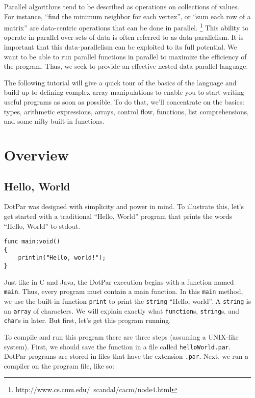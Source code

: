 Parallel algorithms tend to be described as operations on collections of values. For instance, ``find the minimum neighbor for each vertex'', or ``sum each row of a matrix'' are data-centric operations that can be done in parallel. \footnote{http://www.cs.cmu.edu/~scandal/cacm/node4.html} This ability to operate in parallel over sets of data is often referred to as data-parallelism. It is important that this data-parallelism can be exploited to its full potential. We want to be able to run parallel functions in parallel to maximize the efficiency of the program. Thus, we seek to provide an effective nested data-parallel language.

The following tutorial will give a quick tour of the basics of the language and build up to defining complex array manipulations to enable you to start writing useful programs as soon as possible. To do that, we'll concentrate on the basics: types, arithmetic expressions, arrays, control flow, functions, list comprehensions, and some nifty built-in functions.

\section{Overview}
\subsection{Hello, World}
DotPar was designed with simplicity and power in mind. To illustrate this, let's get started with a traditional ``Hello, World'' program that prints the words ``Hello, World'' to stdout.

\begin{verbatim}
func main:void()
{
    println("Hello, world!");
}
\end{verbatim}

Just like in C and Java, the DotPar execution begins with a function named \verb=main=. Thus, every program must contain a main function. In this \verb=main= method, we use the built-in function \verb=print= to print the \verb=string= ``Hello, world''. A \verb=string= is an \verb=array= of characters. We will explain exactly what \verb=function=s, \verb=string=s, and \verb=char=s in later. But first, let's get this program running.

To compile and run this program there are three steps (assuming a UNIX-like system). First, we should save the function in a file called \verb=helloWorld.par=. DotPar programs are stored in files that have the extension \verb=.par=. Next, we run a compiler on the program file, like so:

